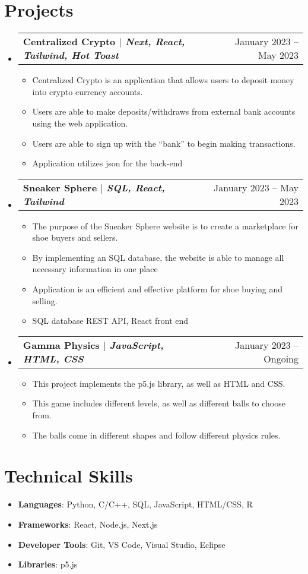 \documentclass[letterpaper,11pt]{article}
\makeatletter
\newcommand{\projectItem}[1]{
  \item\small{#1}
}
\newcommand{\projectSubHeading}[2]{
  \vspace{-1pt}\item
    \begin{tabular*}{0.97\textwidth}[t]{l@{\extracolsep{\fill}}r}
      \textbf{#1} & #2 \\
    \end{tabular*}\vspace{-5pt}
}
\newcommand{\resumeSubHeadingListStart}{\begin{itemize}[leftmargin=*,label=\textbullet]}
\newcommand{\resumeSubHeadingListEnd}{\end{itemize}}
\newcommand{\resumeItemListStart}{\begin{itemize}[leftmargin=*,label=\textcolor{black}{$\circ$}]}
\newcommand{\resumeItemListEnd}{\end{itemize}}
\makeatother
\begin{document}
\section{Projects}
  \resumeSubHeadingListStart
    \projectSubHeading
      {\textbf{Centralized Crypto} $|$ \emph{Next, React, Tailwind, Hot Toast}}{January 2023 -- May 2023}
      \resumeItemListStart
        \projectItem
          {Centralized Crypto is an application that allows users to deposit money into crypto currency accounts.}
        \projectItem
          {Users are able to make deposits/withdraws from external bank accounts using the web application.}
        \projectItem
          {Users are able to sign up with the “bank” to begin making transactions.}
        \projectItem
          {Application utilizes json for the back-end}
      \resumeItemListEnd
    \projectSubHeading
      {\textbf{Sneaker Sphere} $|$ \emph{SQL, React, Tailwind}}{January 2023 -- May 2023}
      \resumeItemListStart
        \projectItem
          {The purpose of the Sneaker Sphere website is to create a marketplace for shoe buyers and sellers.}
        \projectItem
          {By implementing an SQL database, the website is able to manage all necessary information in one place}
        \projectItem
          {Application is an efficient and effective platform for shoe buying and selling.}
        \projectItem
          {SQL database REST API, React front end}
      \resumeItemListEnd
    \projectSubHeading
      {\textbf{Gamma Physics} $|$ \emph{JavaScript, HTML, CSS}}{January 2023 -- Ongoing}
      \resumeItemListStart
        \projectItem
          {This project implements the p5.js library, as well as HTML and CSS.}
        \projectItem
          {This game includes different levels, as well as different balls to choose from.}
        \projectItem
          {The balls come in different shapes and follow different physics rules.}
      \resumeItemListEnd
  \resumeSubHeadingListEnd


\section{Technical Skills}
\begin{itemize}[leftmargin=*]
    \item \small{\textbf{Languages}{: Python, C/C++, SQL, JavaScript, HTML/CSS, R}}
    \item \small{\textbf{Frameworks}{: React, Node.js, Next.js}}
    \item \small{\textbf{Developer Tools}{: Git, VS Code, Visual Studio, Eclipse}}
    \item \small{\textbf{Libraries}{: p5.js}}
\end{itemize}



\end{document}

